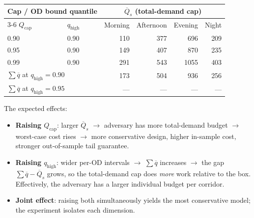 \documentclass[11pt]{article}
\theoremstyle{definition}
\begin{document}
\begin{center}
	\begin{tabular}{llrrrr}
		\toprule
		\multicolumn{2}{l}{Cap / OD bound quantile}                        & \multicolumn{4}{c}{$\overline{Q}_s$ (total-demand cap)}                                         \\
		\cmidrule(lr){3-6}
		$Q_{\mathrm{cap}}$                                                 & $q_{\mathrm{high}}$                                     & Morning & Afternoon & Evening & Night \\
		\midrule
		0.90                                                               & 0.90                                                    & 110     & 377       & 696     & 209   \\
		0.95                                                               & 0.90                                                    & 149     & 407       & 870     & 235   \\
		0.99                                                               & 0.90                                                    & 291     & 543       & 1055    & 403   \\
		\midrule
		\multicolumn{2}{l}{$\sum\overline{q}$ at $q_{\mathrm{high}}=0.90$} & 173                                                     & 504     & 936       & 256             \\
		\multicolumn{2}{l}{$\sum\overline{q}$ at $q_{\mathrm{high}}=0.95$} & —                                                       & —       & —         & —               \\
		\bottomrule
	\end{tabular}
\end{center}

The expected effects:
\begin{itemize}
	\item \textbf{Raising $Q_{\mathrm{cap}}$}: larger $\overline{Q}_s$ $\to$ adversary
	      has more total-demand budget $\to$ worst-case cost rises $\to$ more
	      conservative design, higher in-sample cost, stronger out-of-sample
	      tail guarantee.
	\item \textbf{Raising $q_{\mathrm{high}}$}: wider per-OD intervals $\to$ $\sum\overline{q}$
	      increases $\to$ the gap $\sum\overline{q} - \overline{Q}_s$ grows, so the
	      total-demand cap does \emph{more} work relative to the box.  Effectively,
	      the adversary has a larger individual budget per corridor.
	\item \textbf{Joint effect}: raising both simultaneously yields the most
	      conservative model; the experiment isolates each dimension.
\end{itemize}
\end{document}
